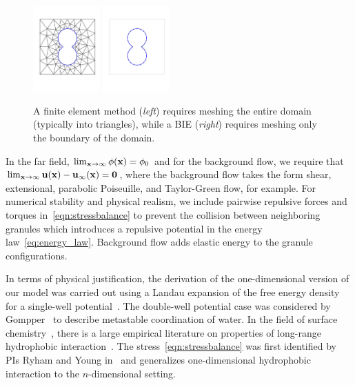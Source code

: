 \begin{figure}
  \centering
  \includegraphics[width=1in]{figures/Background/Peanut/PeanutFEM.pdf}
  \includegraphics[width=1in]{figures/Background/Peanut/PeanutIE.pdf}
  \caption{\label{fig:fem_vs_bie} \footnotesize A finite element method
  ({\em left}) requires meshing the entire domain (typically into
  triangles), while a BIE ({\em right}) requires meshing only the
  boundary of the domain.}
\end{figure}
In the far field, $\lim_{\mathbf{x} \to \infty} \phi(\mathbf{x}) = \phi_0$ and for the
background flow, we require that $\lim_{\mathbf{x} \to \infty} \mathbf{u}(\mathbf{x}) -
\mathbf{u}_{\infty}(\mathbf{x}) = \mathbf{0}$, where
the background flow takes the form
shear, extensional, parabolic Poiseuille, and
Taylor-Green flow, for example.
For numerical stability and physical realism, we
include pairwise repulsive forces and torques
in~\eqref{eqn:stressbalance} to prevent the collision between
neighboring granules which introduces a repulsive potential in the energy
law~\eqref{eq:energy_law}. Background flow adds elastic energy to the
granule configurations.

In terms of physical justification, the derivation of the
one-dimensional version of our model was carried out using a Landau
expansion of the free energy density for a single-well
potential~\cite{MaRa76, ErLjCl89}. The double-well potential case was
considered by Gompper~\cite{GoHaKo94} to describe metastable
coordination of water. In the field of surface
chemistry~\cite{Israelachvili1954}, there is a large empirical
literature on properties of long-range hydrophobic
interaction~\cite{LeRaPa77, KoNa15, Nagle17, Lum1999, Lin2005,
Meyer2006, Ducker2016, Jackson2016, Gletal88, Aketal17, Ch05}. The
stress~\eqref{eqn:stressbalance} was first identified by PIs Ryham and
Young in~\cite{Fu2018_SIAM} and generalizes one-dimensional hydrophobic
interaction to the $n$-dimensional setting. 

